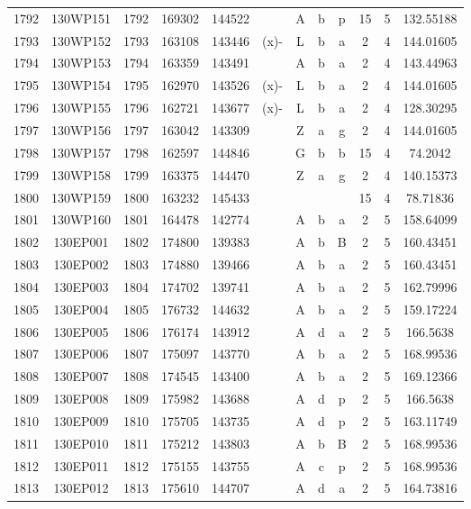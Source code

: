 \begin{tabular}{|*{12}{c|}}
1792 & 130WP151 & 1792 & 169302 & 144522 &  & A & b & p & 15 & 5 & 132.55188 \\ 
1793 & 130WP152 & 1793 & 163108 & 143446 & (x)- & L & b & a & 2 & 4 & 144.01605 \\ 
1794 & 130WP153 & 1794 & 163359 & 143491 &  & A & b & a & 2 & 4 & 143.44963 \\ 
1795 & 130WP154 & 1795 & 162970 & 143526 & (x)- & L & b & a & 2 & 4 & 144.01605 \\ 
1796 & 130WP155 & 1796 & 162721 & 143677 & (x)- & L & b & a & 2 & 4 & 128.30295 \\ 
1797 & 130WP156 & 1797 & 163042 & 143309 &  & Z & a & g & 2 & 4 & 144.01605 \\ 
1798 & 130WP157 & 1798 & 162597 & 144846 &  & G & b & b & 15 & 4 & 74.2042 \\ 
1799 & 130WP158 & 1799 & 163375 & 144470 &  & Z & a & g & 2 & 4 & 140.15373 \\ 
1800 & 130WP159 & 1800 & 163232 & 145433 &  &  &  &  & 15 & 4 & 78.71836 \\ 
1801 & 130WP160 & 1801 & 164478 & 142774 &  & A & b & a & 2 & 5 & 158.64099 \\ 
1802 & 130EP001 & 1802 & 174800 & 139383 &  & A & b & B & 2 & 5 & 160.43451 \\ 
1803 & 130EP002 & 1803 & 174880 & 139466 &  & A & b & a & 2 & 5 & 160.43451 \\ 
1804 & 130EP003 & 1804 & 174702 & 139741 &  & A & b & a & 2 & 5 & 162.79996 \\ 
1805 & 130EP004 & 1805 & 176732 & 144632 &  & A & b & a & 2 & 5 & 159.17224 \\ 
1806 & 130EP005 & 1806 & 176174 & 143912 &  & A & d & a & 2 & 5 & 166.5638 \\ 
1807 & 130EP006 & 1807 & 175097 & 143770 &  & A & b & a & 2 & 5 & 168.99536 \\ 
1808 & 130EP007 & 1808 & 174545 & 143400 &  & A & b & a & 2 & 5 & 169.12366 \\ 
1809 & 130EP008 & 1809 & 175982 & 143688 &  & A & d & p & 2 & 5 & 166.5638 \\ 
1810 & 130EP009 & 1810 & 175705 & 143735 &  & A & d & p & 2 & 5 & 163.11749 \\ 
1811 & 130EP010 & 1811 & 175212 & 143803 &  & A & b & B & 2 & 5 & 168.99536 \\ 
1812 & 130EP011 & 1812 & 175155 & 143755 &  & A & c & p & 2 & 5 & 168.99536 \\ 
1813 & 130EP012 & 1813 & 175610 & 144707 &  & A & d & a & 2 & 5 & 164.73816 \\ 

\end{tabular}
